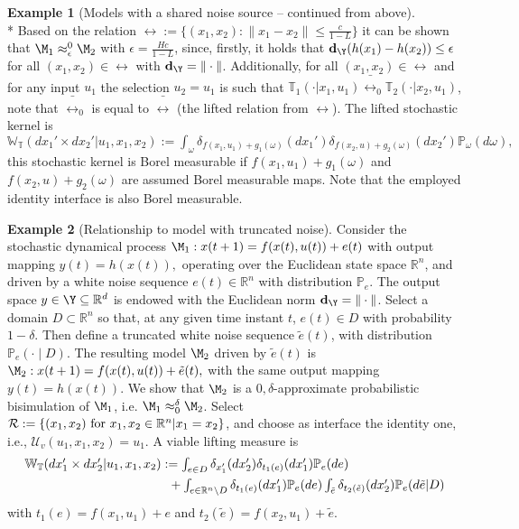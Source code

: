 \documentclass[letterpaper, 10 pt, conference]{amsart}
\theoremstyle{definition}
\theoremstyle{example}
\newtheorem{example}{Example}
\theoremstyle{remark}
\newcommand{\po}{\mathbb{P}}     \newcommand{\p}[1]{\po\left(#1\right)}     \newcommand{\pd}[1]{p\left(#1\right)}     \newcommand{\borel}[1]{\mathcal{B}\left(#1\right)}
\newcommand{\eps}{\epsilon}
\newcommand{\InF}{\mathcal{U}_{v}}
\newcommand{\Wt}{\mathbb{W}_{\mathbb{T}}}
\begin{document}
\begin{example}[Models with a shared noise source -- continued from above]\label{ex:3}\mbox{ }\\*
Based on the relation $\rel:=\{ (x_1,x_2):\|x_1-x_2\|\leq \frac{c}{1-L}\}$ it can be shown that $\M_1\approx_{\eps}^{0}\M_2$ with $\eps=\frac{H c}{1-L}$, 
since, firstly, it holds that $\mathbf{d}_\Y(h(x_1)-h(x_2))\leq \eps$ for all $(x_1,x_2)\in \rel$ with $\mathbf{d}_\Y=\|\cdot\|$. 
Additionally, 
for all $(x_1,x_2)\in \rel$ and for any input $u_1$
the selection $u_2=u_1$ is such that $\mathbb T_1(\cdot|x_1,u_1)\bar\rel_0 \mathbb T_2(\cdot|x_2,u_1)$, note that $\bar\rel_0$ is equal to $\bar\rel$ (the lifted relation from $\rel$).
The lifted stochastic kernel is 
\(\textstyle \Wt (dx_1'\times dx_2'| u_1,x_1,x_2):= \int_{\omega}\delta_{f(x_1,u_1)+g_1(\omega)} (dx_1')  \delta_{f(x_2,u)+g_2(\omega)} (dx_2') \mathbb P_\omega(d\omega),\)
this stochastic kernel is Borel measurable if $f(x_1,u_1)+g_1(\omega)$ and $f(x_2,u)+g_2(\omega)$ are  assumed Borel measurable maps. 
Note that the employed identity interface is also Borel measurable.
\end{example}
\begin{example}[Relationship to model with truncated noise]\label{ex:trunc}
Consider the stochastic dynamical process 
\(\M_1:  
x(t+1)=f(x(t),u(t))+ e(t)\) with output mapping \( y(t)=h(x(t)),\) operating over the Euclidean state space $\mathbb R^n$, 
and driven by a white noise sequence $e(t)\in \mathbb R^n$ with distribution $\mathbb P_{e}$. 
The output space $y\in \Y\subseteq\mathbb R^d$ is endowed with the Euclidean norm $\mathbf d_\Y=\|\cdot\|$. 
Select a domain $D\subset \mathbb R^n$ so that, at any given time instant $t$,  
$e(t)\in D$ with probability $1-\delta $. 
Then define a truncated white noise sequence $\tilde e(t)$, with distribution $\mathbb{P}_e\left(\cdot \mid D\right)$. The resulting model $\M_2$ driven by $\tilde e(t)$ is 
\(\M_2:  
x(t+1)=f(x(t),u(t))+ \tilde e(t),\) with the same output mapping \(y(t)=h(x(t)).\)
We show that $\M_2$ is a $0,\delta$-approximate probabilistic bisimulation of $\M_1$, i.e. $\M_1\approx_0^\delta\M_2$. 
Select $\mathcal R:=\{(x_1,x_2)\textmd{ for }x_1,x_2\in \mathbb R^n|x_1=x_2\}$, and  choose as interface the identity one, i.e., $\InF(u_1,x_1,x_2)=u_1$. 
A viable lifting measure is 
\begin{align}& 
\textstyle\Wt(dx_1'\times dx_2'|u_1,x_1,x_2):=
 \int_{e\in D} \delta_{x_1'} (dx_2')  \delta_{t_1(e)} (dx_1') \po_e(de)\label{eq:ref truncnoise}\\&\textstyle\hspace{4cm}
+ \int_{e\in\mathbb R^n\setminus D} \delta_{t_1(e)} (dx_1')\po_e(de)
\int_{\tilde e}\delta_{t_2(\tilde e)}  (dx_2') \po_e(d\tilde e|D)  \notag 
 \end{align}
 with $t_1(e)=f(x_1,u_1)+e$ and $t_2(\tilde e)=f(x_2,u_1)+\tilde e$.
 \end{example}
\end{document}
